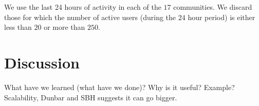 \documentclass[10pt]{article}
\begin{document}
\begin{multicols}{2}
We use the last 24 hours of activity in each of the $17$ communities. We discard those for which the number of active users (during the $24$ hour period) is either less than $20$ or more than $250$.
\section{Discussion}
What have we learned (what have we done)?
Why is it useful? Example?
Scalability, Dunbar and SBH suggests it can go bigger.

\end{multicols}
\small


\normalsize
\end{document}
